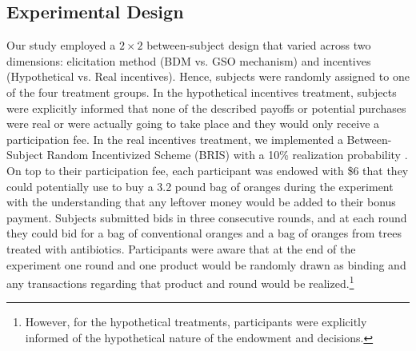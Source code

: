 \documentclass[12pt]{article}
\begin{document}
\subsection{Experimental Design}
Our study employed a $2\times2$ between-subject design that varied across two dimensions: elicitation method (BDM vs. GSO mechanism) and incentives (Hypothetical vs. Real incentives). Hence, subjects were randomly assigned to one of the four treatment groups. In the hypothetical incentives treatment, subjects were explicitly informed that none of the described payoffs or potential purchases were real or were actually going to take place and they would only receive a participation fee. In the real incentives treatment, we implemented a Between-Subject Random Incentivized Scheme (BRIS) with a 10\% realization probability \citep{ahles_testing_2024}. On top to their participation fee, each participant was endowed with \$6 that they could potentially use to buy a 3.2 pound bag of oranges during the experiment with the understanding that any leftover money would be added to their bonus payment. Subjects submitted bids in three consecutive rounds, and at each round they could bid for a bag of conventional oranges and a bag of oranges from trees treated with antibiotics. Participants were aware that at the end of the experiment one round and one product would be randomly drawn as binding and any transactions regarding that product and round would be realized.\footnote{ However, for the hypothetical treatments, participants were explicitly informed of the hypothetical nature of the endowment and decisions.}  
\end{document}
